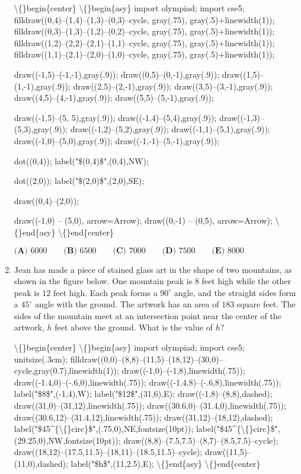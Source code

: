 \documentclass{article}
\begin{document}
\begin{enumerate}[label=\arabic*., itemsep=0.5em]
\textbackslash\{\}begin\{center\}
\textbackslash\{\}begin\{asy\}
import olympiad;
import cse5;
filldraw((0,4)--(1,4)--(1,3)--(0,3)--cycle, gray(.75), gray(.5)+linewidth(1));
filldraw((0,3)--(1,3)--(1,2)--(0,2)--cycle, gray(.75), gray(.5)+linewidth(1));
filldraw((1,2)--(2,2)--(2,1)--(1,1)--cycle, gray(.75), gray(.5)+linewidth(1));
filldraw((1,1)--(2,1)--(2,0)--(1,0)--cycle, gray(.75), gray(.5)+linewidth(1));

draw((-1,5)--(-1,-1),gray(.9));
draw((0,5)--(0,-1),gray(.9));
draw((1,5)--(1,-1),gray(.9));
draw((2,5)--(2,-1),gray(.9));
draw((3,5)--(3,-1),gray(.9));
draw((4,5)--(4,-1),gray(.9));
draw((5,5)--(5,-1),gray(.9));

draw((-1,5)--(5, 5),gray(.9));
draw((-1,4)--(5,4),gray(.9));
draw((-1,3)--(5,3),gray(.9));
draw((-1,2)--(5,2),gray(.9));
draw((-1,1)--(5,1),gray(.9));
draw((-1,0)--(5,0),gray(.9));
draw((-1,-1)--(5,-1),gray(.9));


dot((0,4));
label("\$(0,4)\$",(0,4),NW);

dot((2,0));
label("\$(2,0)\$",(2,0),SE);

draw((0,4)--(2,0));

draw((-1,0) -- (5,0), arrow=Arrow);
draw((0,-1) -- (0,5), arrow=Arrow);
\textbackslash\{\}end\{asy\}
\textbackslash\{\}end\{center\}


\(\textbf{(A) }6000\qquad\textbf{(B) }6500\qquad\textbf{(C) }7000\qquad\textbf{(D) }7500\qquad\textbf{(E) }8000\)\par \vspace{0.5em}\item Jean has made a piece of stained glass art in the shape of two mountains, as shown in the figure below. One mountain peak is \(8\) feet high while the other peak is \(12\) feet high. Each peak forms a \(90^\circ\) angle, and the straight sides form a \(45^\circ\) angle with the ground. The artwork has an area of \(183\) square feet. The sides of the mountain meet at an intersection point near the center of the artwork, \(h\) feet above the ground. What is the value of \(h?\)


\textbackslash\{\}begin\{center\}
\textbackslash\{\}begin\{asy\}
import olympiad;
import cse5;
unitsize(.3cm);
filldraw((0,0)--(8,8)--(11,5)--(18,12)--(30,0)--cycle,gray(0.7),linewidth(1));
draw((-1,0)--(-1,8),linewidth(.75));
draw((-1.4,0)--(-.6,0),linewidth(.75));
draw((-1.4,8)--(-.6,8),linewidth(.75));
label("\$8\$",(-1,4),W);
label("\$12\$",(31,6),E);
draw((-1,8)--(8,8),dashed);
draw((31,0)--(31,12),linewidth(.75));
draw((30.6,0)--(31.4,0),linewidth(.75));
draw((30.6,12)--(31.4,12),linewidth(.75));
draw((31,12)--(18,12),dashed);
label("\$45\^{}\{\textbackslash\{\}circ\}\$",(.75,0),NE,fontsize(10pt));
label("\$45\^{}\{\textbackslash\{\}circ\}\$",(29.25,0),NW,fontsize(10pt));
draw((8,8)--(7.5,7.5)--(8,7)--(8.5,7.5)--cycle);
draw((18,12)--(17.5,11.5)--(18,11)--(18.5,11.5)--cycle);
draw((11,5)--(11,0),dashed);
label("\$h\$",(11,2.5),E);
\textbackslash\{\}end\{asy\}
\textbackslash\{\}end\{center\}



\end{enumerate}
\end{document}
